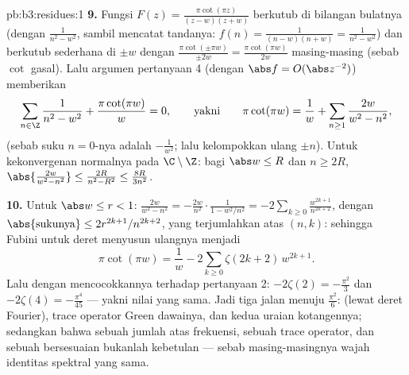 \begin{solution}{pb:b3:residues:1}
\textbf{9.} Fungsi $F(z) = \frac{\pi\cot(\pi z)}{(z - w)(z + w)}$
berkutub di bilangan bulatnya (dengan  $\frac1{n^2 - w^2}$,
sambil mencatat tandanya: $f(n) = \frac1{(n-w)(n+w)} = \frac1{n^2 -
w^2}$) dan berkutub sederhana di $\pm w$ dengan 
$\frac{\pi\cot(\pm\pi w)}{\pm2w} = \frac{\pi\cot(\pi
w)}{2w}$ masing-masing (sebab $\cot$ gasal). Lalu argumen pertanyaan 4
(dengan $\abs f = O(\abs z^{-2})$) memberikan
\[
\sum_{n\in\Z}\frac1{n^2 - w^2} + \frac{\pi\cot(\pi w)}{w} =
0,
\qquad\text{yakni}\qquad
\pi\cot(\pi w) = \frac1w + \sum_{n\geq1}\frac{2w}{w^2 -
n^2},
\]
(sebab suku $n = 0$-nya adalah $-\frac1{w^2}$; lalu kelompokkan ulang $\pm n$). Untuk kekonvergenan
normalnya pada  $\C\setminus\Z$: bagi $\abs w \leq
R$ dan $n \geq 2R$, $\abs{\frac{2w}{w^2 - n^2}} \leq
\frac{2R}{n^2 - R^2} \leq \frac{8R}{3n^2}$.

\textbf{10.} Untuk $\abs w \leq r < 1$: $\frac{2w}{w^2 - n^2} =
-\frac{2w}{n^2}\cdot\frac1{1 - w^2/n^2} =
-2\sum_{k\geq0}\frac{w^{2k+1}}{n^{2k+2}}$, dengan
$\abs{\text{sukunya}} \leq 2r^{2k+1}/n^{2k+2}$, yang terjumlahkan atas
$(n, k)$: sehingga Fubini untuk deret menyusun ulangnya menjadi
\[
\pi\cot(\pi w) = \frac1w -
2\sum_{k\geq0}\zeta(2k+2)\,w^{2k+1} .
\]
Lalu dengan mencocokkannya terhadap pertanyaan 2: $-2\zeta(2) = -\frac{\pi^2}3$ dan
$-2\zeta(4) = -\frac{\pi^4}{45}$ --- yakni nilai yang sama. Jadi tiga
jalan menuju $\frac{\pi^2}6$:  (lewat deret Fourier),
trace operator Green dawainya, dan kedua uraian
kotangennya; sedangkan bahwa sebuah jumlah atas frekuensi, sebuah trace operator,
dan sebuah  bersesuaian bukanlah kebetulan --- sebab masing-masingnya
wajah identitas spektral yang sama.


\end{solution}
